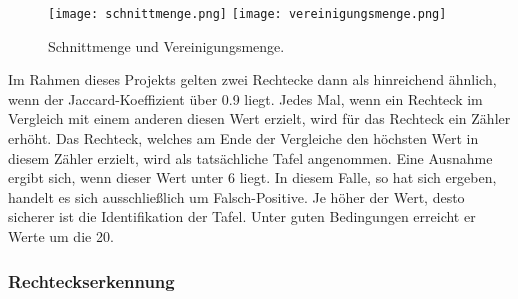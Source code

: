 \begin{figure}[h!]
\texttt{[image: schnittmenge.png]}
\texttt{[image: vereinigungsmenge.png]}
\caption{Schnittmenge und Vereinigungsmenge.}
\label{fig:jaccard}
\end{figure}

Im Rahmen dieses Projekts gelten zwei Rechtecke dann als hinreichend ähnlich, wenn der Jaccard-Koeffizient über 0.9 liegt. Jedes Mal, wenn ein Rechteck im Vergleich mit einem anderen diesen Wert erzielt, wird für das Rechteck ein Zähler erhöht. Das Rechteck, welches am Ende der Vergleiche den höchsten Wert in diesem Zähler erzielt, wird als tatsächliche Tafel angenommen. Eine Ausnahme ergibt sich, wenn dieser Wert unter 6 liegt. In diesem Falle, so hat sich ergeben, handelt es sich ausschließlich um Falsch-Positive. Je höher der Wert, desto sicherer ist die Identifikation der Tafel. Unter guten Bedingungen erreicht er Werte um die 20.

\subsubsection*{Rechteckserkennung}


